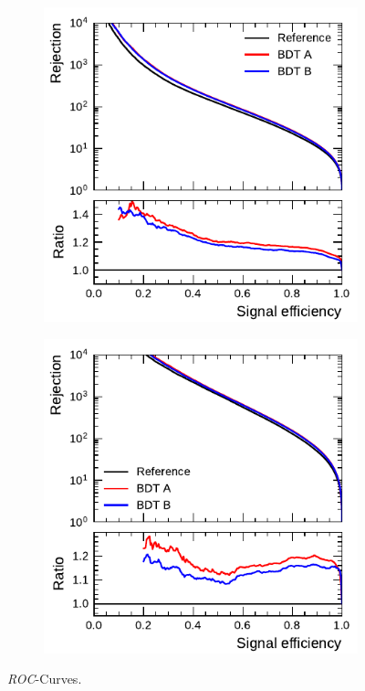 \begin{figure}[htb]
  \begin{subfigure}[t]{0.48\textwidth}
    \centering
    \includegraphics{./figures/bdt_perf/roc/bdt_1p_comparison.pdf}
    \label{fig:bdt_1p_roc}
  \end{subfigure}\hfill
  \begin{subfigure}[t]{0.48\textwidth}
    \centering
    \includegraphics{./figures/bdt_perf/roc/bdt_3p_comparison.pdf}
    \label{fig:bdt_3p_roc}
  \end{subfigure}
  \caption{\emph{ROC}-Curves. }
  \label{fig:bdt_rocs}
\end{figure}

